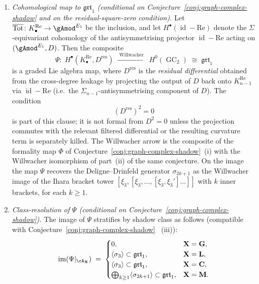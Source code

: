 \begin{theorem}
\begin{enumerate}[label=\textup{(\roman*)}]
\item \emph{Cohomological map to $\mathfrak{grt}_1$
\textup{(}conditional on
Conjecture~\textup{\ref{conj:graph-complex-shadow}} and on
the residual-square-zero condition\textup{)}.} Let
\(\overline{\operatorname{Tot}}\colon K^{\mathrm{Re}}_\bullet
\to{\gAmod}^{E_1}\) be the inclusion, and let
$H^\bullet(\operatorname{id}-\mathrm{Re})$ denote the
$\Sigma$-equivariant cohomology of the antisymmetrising projector
$\operatorname{id}-\mathrm{Re}$ acting on
$({\gAmod}^{E_1},D)$. Then the composite
\[
 \Psi\colon\;
 H^\bullet(K^{\mathrm{Re}}_\bullet,D^{\mathrm{res}})
 \;\xrightarrow{\;\text{Willwacher}\;}\;
 H^0(\operatorname{GC}_2)
 \;\cong\;
 \mathfrak{grt}_1
\]
is a graded Lie algebra map, where $D^{\mathrm{res}}$ is the
\emph{residual differential} obtained from the cross-degree
leakage by projecting the output of $D$ back onto
$K^{\mathrm{Re}}_{n-1}$ via
$\operatorname{id}-\mathrm{Re}$
\textup{(}i.e.\ the $\Sigma_{n-1}$-antisymmetrising component of
$D$\textup{)}. The condition
\[
(D^{\mathrm{res}})^2=0
\]
is part of this clause; it is not formal from \(D^2=0\) unless the
projection commutes with the relevant filtered differential or the
resulting curvature term is separately killed. The Willwacher arrow is
the composite of the
formality map $\Phi$ of
Conjecture~\textup{\ref{conj:graph-complex-shadow}}~\textup{(i)}
with the Willwacher isomorphism of
part~\textup{(ii)} of the same conjecture. On the image the map
$\Psi$ recovers the Deligne--Drinfeld generator $\sigma_{2k+1}$ as
the Willwacher image of the Ihara bracket tower
$[\xi_3,[\xi_3,\dots,[\xi_3,\xi_3']\dots]]$ with $k$ inner brackets,
for each $k\geq 1$.

\item \emph{Class-resolution of $\Psi$
\textup{(}conditional on
Conjecture~\textup{\ref{conj:graph-complex-shadow}}\textup{)}.}
The image of $\Psi$ stratifies by shadow class as follows
\textup{(}compatible with
Conjecture~\textup{\ref{conj:graph-complex-shadow}}~%
\textup{(iii)}\textup{)}:
\[
 \operatorname{im}(\Psi|_{\cA_\mathbf{X}})
 \;=\;
 \begin{cases}
 0,
 & \mathbf{X}=\mathbf{G},\\
 \langle\sigma_3\rangle\subset\mathfrak{grt}_1,
 & \mathbf{X}=\mathbf{L},\\
 \langle\sigma_3\rangle\subset\mathfrak{grt}_1,
 & \mathbf{X}=\mathbf{C},\\
 \bigoplus_{k\geq 1}\langle\sigma_{2k+1}\rangle\subset\mathfrak{grt}_1,
 & \mathbf{X}=\mathbf{M}.
 \end{cases}
\]


\end{enumerate}
\end{theorem}
